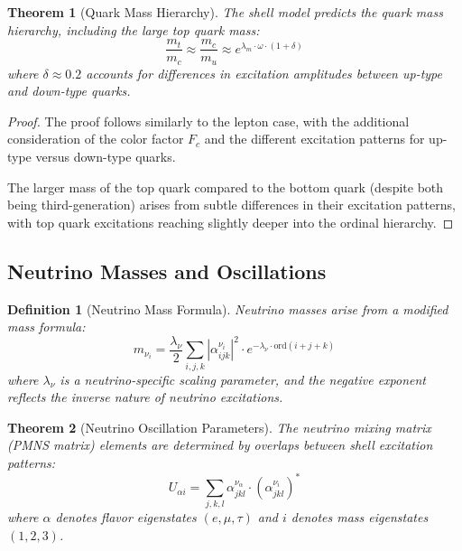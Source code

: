 \documentclass[12pt,a4paper]{article}
\newtheorem{theorem}{Theorem}[section]
\newtheorem{definition}{Definition}[section]
\newcommand{\ord}{\text{ord}}
\begin{document}
\begin{theorem}[Quark Mass Hierarchy]
\label{thm:quark-mass-hierarchy}
The shell model predicts the quark mass hierarchy, including the large top quark mass:
\begin{equation}
\frac{m_t}{m_c} \approx \frac{m_c}{m_u} \approx e^{\lambda_m \cdot \omega \cdot (1 + \delta)}
\end{equation}
where $\delta \approx 0.2$ accounts for differences in excitation amplitudes between up-type and down-type quarks.
\end{theorem}

\begin{proof}
The proof follows similarly to the lepton case, with the additional consideration of the color factor $F_c$ and the different excitation patterns for up-type versus down-type quarks.

The larger mass of the top quark compared to the bottom quark (despite both being third-generation) arises from subtle differences in their excitation patterns, with top quark excitations reaching slightly deeper into the ordinal hierarchy.
\end{proof}

\subsection{Neutrino Masses and Oscillations}
\label{subsec:neutrino-masses}

\begin{definition}[Neutrino Mass Formula]
\label{def:neutrino-mass}
Neutrino masses arise from a modified mass formula:
\begin{equation}
m_{\nu_i} = \frac{\lambda_{\nu}}{2} \sum_{i,j,k} |\alpha_{ijk}^{\nu_i}|^2 \cdot e^{-\lambda_{\nu} \cdot \ord(i+j+k)}
\end{equation}
where $\lambda_{\nu}$ is a neutrino-specific scaling parameter, and the negative exponent reflects the inverse nature of neutrino excitations.
\end{definition}

\begin{theorem}[Neutrino Oscillation Parameters]
\label{thm:neutrino-oscillation}
The neutrino mixing matrix (PMNS matrix) elements are determined by overlaps between shell excitation patterns:
\begin{equation}
U_{\alpha i} = \sum_{j,k,l} \alpha_{jkl}^{\nu_\alpha} \cdot (\alpha_{jkl}^{\nu_i})^*
\end{equation}
where $\alpha$ denotes flavor eigenstates $(e, \mu, \tau)$ and $i$ denotes mass eigenstates $(1, 2, 3)$.
\end{theorem}
\end{document}
